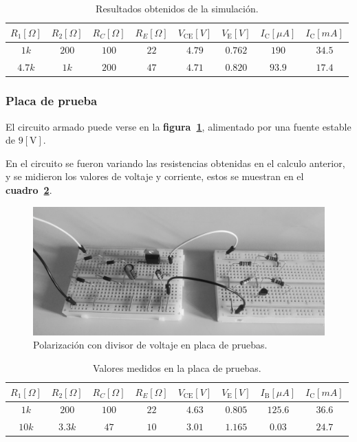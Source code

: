 \begin{table}[!h]
\begin{center}
    \begin{tabular}{|c|c|c|c||c|c||c|c|}
    \hline
    $R_1[\Omega]$ & $R_2[\Omega]$ & $R_C[\Omega]$ & $R_E[\Omega]$ &
    $V_{\text{CE}}[V]$ & $V_{\text{E}}[V]$ &
    $I_{\text{C}}[\mu{A}]$ & $I_{\text{C}}[mA]$
    \tabularnewline \hline \hline
    $  1k$ & $200$ & $100$ & $22$ & $4.79$ & $0.762$ & $ 190$ & $34.5$ \tabularnewline \hline
    $4.7k$ & $ 1k$ & $200$ & $47$ & $4.71$ & $0.820$ & $93.9$ & $17.4$ \tabularnewline \hline
    \end{tabular}
\end{center}
\caption{Resultados obtenidos de la simulación.}
\label{cuadro08}
\end{table}

\subsubsection{Placa de prueba}
El circuito armado puede verse en la \textbf{figura~\ref{figura13}}, alimentado
por una fuente estable de $9[\text{V}]$.

En el circuito se fueron variando las resistencias obtenidas en el calculo
anterior, y se midieron los valores de voltaje y corriente, estos se muestran
en el \textbf{cuadro~\ref{cuadro09}}.

\begin{figure}[!h]
\centering
\includegraphics[scale=0.10]{diagramas/figura13.eps}
\caption{Polarización con divisor de voltaje en placa de pruebas.}
\label{figura13}
\end{figure}

\begin{table}[!h]
\begin{center}
    \begin{tabular}{|c|c|c|c||c|c||c|c|}
    \hline
    $R_1[\Omega]$ & $R_2[\Omega]$ & $R_C[\Omega]$ & $R_E[\Omega]$ &
    $V_{\text{CE}}[V]$ & $V_{\text{E}}[V]$ &
    $I_{\text{B}}[\mu{A}]$ & $I_{\text{C}}[mA]$
    \tabularnewline \hline \hline
    $ 1k$ & $ 200$ & $100$ & $22$ & $4.63$ & $0.805$ & $125.6$ & $36.6$ \tabularnewline \hline
    $10k$ & $3.3k$ & $ 47$ & $10$ & $3.01$ & $1.165$ & $ 0.03$ & $24.7$ \tabularnewline \hline
    \end{tabular}
\end{center}
\caption{Valores medidos en la placa de pruebas.}
\label{cuadro09}
\end{table}

